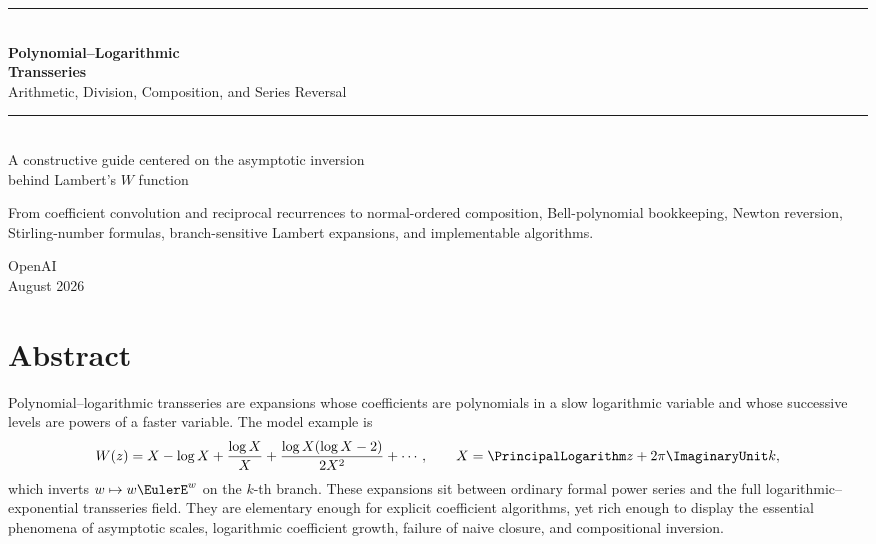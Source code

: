 \documentclass[11pt,openany]{book}
\theoremstyle{definition}
\theoremstyle{plain}
\theoremstyle{remark}
\begin{document}
\frontmatter

\begin{titlepage}
\thispagestyle{empty}
\pagecolor{PaleBlue}
\color{DeepBlue}
\vspace*{1.05in}
\begin{center}
  {\rule{0.88\textwidth}{1.1pt}}\\[1.0em]
  {\fontsize{32}{37}\selectfont\bfseries
   Polynomial--Logarithmic\\[0.12em] Transseries}\\[0.9em]
  {\Large Arithmetic, Division, Composition, and Series Reversal}\\[1.0em]
  {\rule{0.64\textwidth}{0.7pt}}\\[1.8em]
  {\large A constructive guide centered on the asymptotic inversion\\
   behind Lambert's \(W\) function}\\[3.2em]
  \begin{tcolorbox}[width=0.82\textwidth,colback=white,colframe=DeepTeal,
    boxrule=0.8pt,arc=1.5mm,left=3mm,right=3mm,top=2mm,bottom=2mm]
  \centering
  From coefficient convolution and reciprocal recurrences to normal-ordered
  composition, Bell-polynomial bookkeeping, Newton reversion, Stirling-number
  formulas, branch-sensitive Lambert expansions, and implementable algorithms.
  \end{tcolorbox}
  \vfill
  {\large OpenAI}\\[0.5em]
  {\normalsize August 2026}
\end{center}
\color{black}
\nopagecolor
\end{titlepage}

\chapter*{Abstract}
Polynomial--logarithmic transseries are expansions whose coefficients are
polynomials in a slow logarithmic variable and whose successive levels are
powers of a faster variable.  The model example is
\[
 W(z)=X-\log X+\frac{\log X}{X}
      +\frac{\log X(\log X-2)}{2X^2}+\cdots,
 \qquad X=\PrincipalLogarithm z+2\pi \ImaginaryUnit k,
\]
which inverts \(w\mapsto w\EulerE^w\) on the \(k\)-th branch.  These expansions sit
between ordinary formal power series and the full logarithmic--exponential
transseries field.  They are elementary enough for explicit coefficient
algorithms, yet rich enough to display the essential phenomena of asymptotic
scales, logarithmic coefficient growth, failure of naive closure, and
compositional inversion.
\end{document}
